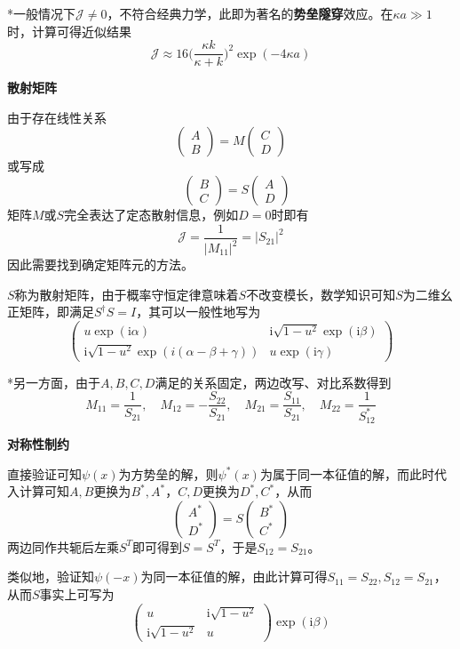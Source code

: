 \documentclass[a4paper,UTF8,fontset=windows]{ctexart}
\newcommand*{\ir}{\mathrm{i}}
\begin{document}
*一般情况下$\mathcal{J}\ne0$，不符合经典力学，此即为著名的\textbf{势垒隧穿}效应。在$\kappa a\gg1$时，计算可得近似结果
$$\mathcal{J}\approx16\bigg(\frac{\kappa k}{\kappa+k}\bigg)^2\exp(-4\kappa a)$$

\textbf{散射矩阵}

由于存在线性关系
$$\begin{pmatrix}A\\B\end{pmatrix}=M\begin{pmatrix}C\\D\end{pmatrix}$$
或写成
$$\quad\begin{pmatrix}B\\C\end{pmatrix}=S\begin{pmatrix}A\\D\end{pmatrix}$$
矩阵$M$或$S$完全表达了定态散射信息，例如$D=0$时即有
$$\mathcal{J}=\frac{1}{|M_{11}|^2}=|S_{21}|^2$$
因此需要找到确定矩阵元的方法。

$S$称为散射矩阵，由于概率守恒定律意味着$S$不改变模长，数学知识可知$S$为二维幺正矩阵，即满足$S^\dagger S=I$，其可以一般性地写为
$$\begin{pmatrix}u\exp(\ir\alpha)&\ir\sqrt{1-u^2}\exp(\ir\beta)\\\ir\sqrt{1-u^2}\exp(i(\alpha-\beta+\gamma))&u\exp(\ir\gamma)\end{pmatrix}$$

*另一方面，由于$A,B,C,D$满足的关系固定，两边改写、对比系数得到
$$M_{11}=\frac{1}{S_{21}},\quad M_{12}=-\frac{S_{22}}{S_{21}},\quad M_{21}=\frac{S_{11}}{S_{21}},\quad M_{22}=\frac{1}{S_{12}^*}$$

\textbf{对称性制约}

直接验证可知$\psi(x)$为方势垒的解，则$\psi^*(x)$为属于同一本征值的解，而此时代入计算可知$A,B$更换为$B^*,A^*$，$C,D$更换为$D^*,C^*$，从而
$$\begin{pmatrix}A^*\\D^*\end{pmatrix}=S\begin{pmatrix}B^*\\C^*\end{pmatrix}$$
两边同作共轭后左乘$S^T$即可得到$S=S^T$，于是$S_{12}=S_{21}$。

类似地，验证知$\psi(-x)$为同一本征值的解，由此计算可得$S_{11}=S_{22},S_{12}=S_{21}$，从而$S$事实上可写为
$$\begin{pmatrix}u&\ir\sqrt{1-u^2}\\\ir\sqrt{1-u^2}&u\end{pmatrix}\exp(\ir\beta)$$
\end{document}
